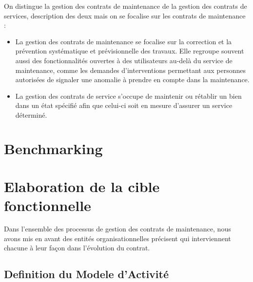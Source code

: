 On distingue la gestion des contrats de maintenance de la gestion des contrats de services, description des deux mais on se focalise sur les contrats de maintenance :

\begin{itemize}
\item La gestion des contrats de maintenance se focalise sur la correction et la prévention systématique et prévisionnelle des travaux. Elle regroupe souvent aussi des fonctionnalités ouvertes à des utilisateurs au-delà du service de maintenance, comme les demandes d’interventions permettant aux personnes autorisées de signaler une anomalie à prendre en compte dans la maintenance.
\item La gestion des contrats de service s’occupe de maintenir ou rétablir un bien dans un état spécifié afin que celui-ci soit en mesure d’assurer un service déterminé.
\end{itemize}




\section{Benchmarking}


\section{Elaboration de la cible fonctionnelle}
Dans l'ensemble des processus de gestion des contrats de maintenance, nous avons mis en avant des entités organisationnelles précisent qui interviennent chacune à leur façon dans l'évolution du contrat.

\subsection{Definition du Modele d'Activité} 

